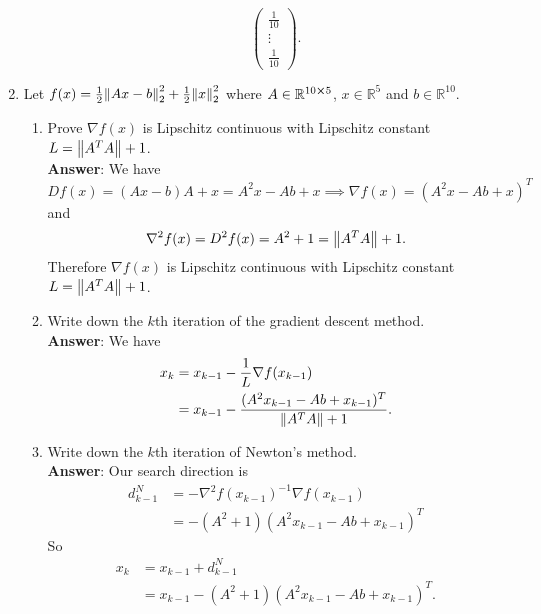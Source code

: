 \documentclass{article}
\begin{document}
\begin{enumerate}
\begin{enumerate}
\[\begin{pmatrix}
                            \frac{1}{10}\\
                            \vdots\\
                            \frac{1}{10}
                        \end{pmatrix}.
                    \]
          \end{enumerate}
          \newpage
    \item Let $f(x)=\frac{1}{2}\norm{Ax-b}_2^2+\frac{1}{2}\norm{x}_2^2$ where $A\in\mathbb{R}^{10\cross 5}$, $x\in\mathbb{R}^5$ and $b\in\mathbb{R}^{10}$.
          \begin{enumerate}
              \item Prove $\nabla f(x)$ is Lipschitz continuous with Lipschitz constant $L=\norm{A^TA}+1$.\\
                    \textbf{Answer}: We have \[Df(x)=(Ax-b)A+x=A^2x-Ab+x\implies\nabla f(x)=(A^2x-Ab+x)^T\] and \[\nabla^2 f(x)=D^2f(x)=A^2+1=\norm{A^TA}+1.\] Therefore $\nabla f(x)$ is Lipschitz continuous with Lipschitz constant $L=\norm{A^TA}+1$.
              \item Write down the $k$th iteration of the gradient descent method.\\
                    \textbf{Answer}: We have \begin{align*}
                        x_k & =x_{k-1}-\dfrac{1}{L}\nabla f(x_{k-1})                     \\
                            & =x_{k-1}-\dfrac{(A^2x_{k-1}-Ab+x_{k-1})^T}{\norm{A^TA}+1}.
                    \end{align*}
              \item Write down the $k$th iteration of Newton's method.\\
                    \textbf{Answer}: Our search direction is
                    \begin{align*}
                        d_{k-1}^N & =-\nabla^2f(x_{k-1})^{-1}\nabla f(x_{k-1}) \\
                                  & =-(A^2+1)(A^2x_{k-1}-Ab+x_{k-1})^T
                    \end{align*}
                    So
                    \begin{align*}
                        x_k & =x_{k-1}+ d_{k-1}^N                        \\
                            & =x_{k-1}-(A^2+1)(A^2x_{k-1}-Ab+x_{k-1})^T.
                    \end{align*}
          \end{enumerate}

\end{enumerate}
\end{document}
